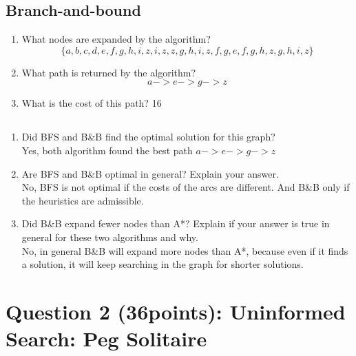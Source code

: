 \documentclass{article}
\def\ans#1{{\color{ans}#1}}
\newcommand{\centerfig}[2]{\begin{center}\texttt{[image: \#2]}\end{center}}
\begin{document}
\subsection{Branch-and-bound}
\begin{enumerate}[label=(\alph*)]
    \item What nodes are expanded by the algorithm?
    \ans{
        \[\{a, b, c, d, e, f, g, h, i, z, i, z, z, g, h, i, z, f, g, e, f, g, h, z, g, h, i, z\}\]
    }
    \item What path is returned by the algorithm?
    \ans{
        \[a->e->g->z\]
    }
    \item What is the cost of this path?
    \ans{
        16
    }
\end{enumerate}

\subsection{}

\begin{enumerate}[label=(\alph*)]
    \item Did BFS and B\&B find the optimal solution for this graph? \\
    \ans{
        Yes, both algorithm found the best path $a->e->g->z$
    }
    \item Are BFS and B\&B optimal in general? Explain your answer. \\
    \ans{
        No, BFS is not optimal if the costs of the arcs are different. And B\&B only if 
        the heuristics are admissible.
    }
    \item Did B\&B expand fewer nodes than A*? Explain if your answer is true in general for these two algorithms and why.\\
    \ans{
        No, in general B\&B will expand more nodes than A*, because even if it finds a solution, it 
        will keep searching in the graph for shorter solutions.
    }
\end{enumerate}


\clearpage
\section{Question 2 (36points): Uninformed Search: Peg Solitaire}
\end{document}
